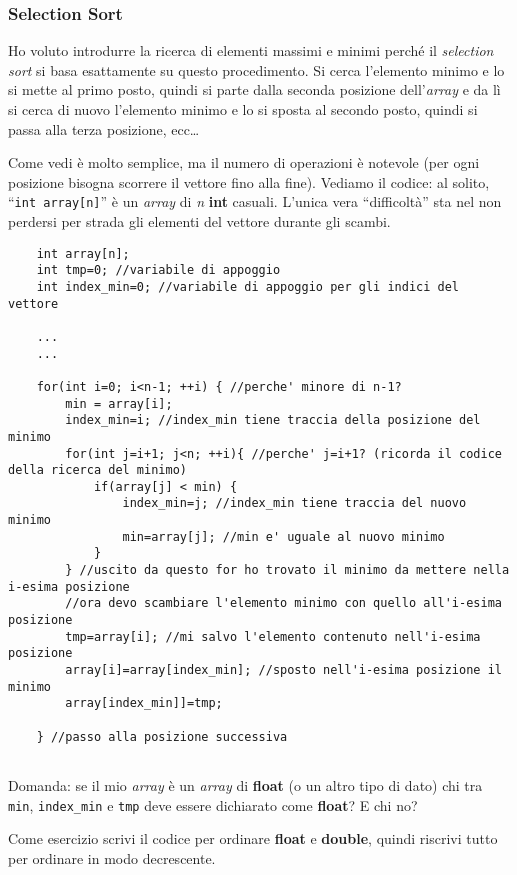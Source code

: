 \subsubsection{Selection Sort}
Ho voluto introdurre la ricerca di elementi massimi e minimi perché il \emph{selection sort} si basa esattamente su questo procedimento. Si cerca l'elemento minimo e lo si mette al primo posto, quindi si parte dalla seconda posizione dell'\emph{array} e da lì si cerca di nuovo l'elemento minimo e lo si sposta al secondo posto, quindi si passa alla terza posizione, ecc\ldots

Come vedi è molto semplice, ma il numero di operazioni è notevole (per ogni posizione bisogna scorrere il vettore fino alla fine). 
Vediamo il codice: al solito, ``\lstinline|int array[n]|'' è un \emph{array} di \emph{n} \textbf{int} casuali. L'unica vera ``difficoltà'' sta nel non perdersi per strada gli elementi del vettore durante gli scambi.

\begin{lstlisting}
	int array[n];
	int tmp=0; //variabile di appoggio
	int index_min=0; //variabile di appoggio per gli indici del vettore
	
	...
	...
	
	for(int i=0; i<n-1; ++i) { //perche' minore di n-1?
		min = array[i]; 
		index_min=i; //index_min tiene traccia della posizione del minimo
		for(int j=i+1; j<n; ++i){ //perche' j=i+1? (ricorda il codice della ricerca del minimo)
			if(array[j] < min) {
				index_min=j; //index_min tiene traccia del nuovo minimo
				min=array[j]; //min e' uguale al nuovo minimo
			}
		} //uscito da questo for ho trovato il minimo da mettere nella i-esima posizione
		//ora devo scambiare l'elemento minimo con quello all'i-esima posizione
		tmp=array[i]; //mi salvo l'elemento contenuto nell'i-esima posizione
		array[i]=array[index_min]; //sposto nell'i-esima posizione il minimo
		array[index_min]]=tmp; 
		
	} //passo alla posizione successiva
	
\end{lstlisting}

Domanda: se il mio \emph{array} è un \emph{array} di \textbf{float} (o un altro tipo di dato) chi tra \verb|min|, \verb|index_min| e \verb|tmp| deve essere dichiarato come \textbf{float}? E chi no?

Come esercizio scrivi il codice per ordinare \textbf{float} e \textbf{double}, quindi riscrivi tutto per ordinare in modo decrescente.
